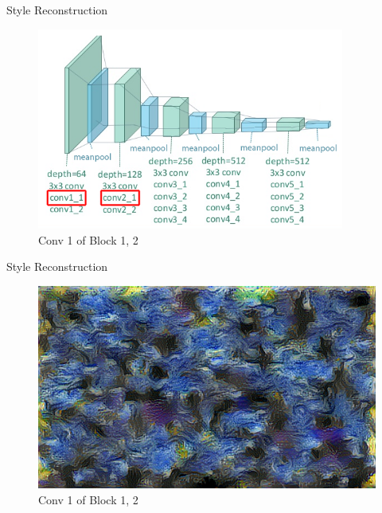 \documentclass{beamer}
\begin{document}
\begin{frame}{Style Reconstruction}
\begin{figure}[ht]
\centering
\caption{Conv 1 of Block 1, 2}
\includegraphics[width=0.9\textwidth]{img/vgg19/style/block2_conv1}
\end{figure}
\end{frame}
\begin{frame}{Style Reconstruction}
\begin{figure}[ht]
\centering
\caption{Conv 1 of Block 1, 2}
\includegraphics[width=\textwidth]{img/style/block2_conv1.png}
\end{figure}
\end{frame}
\end{document}
